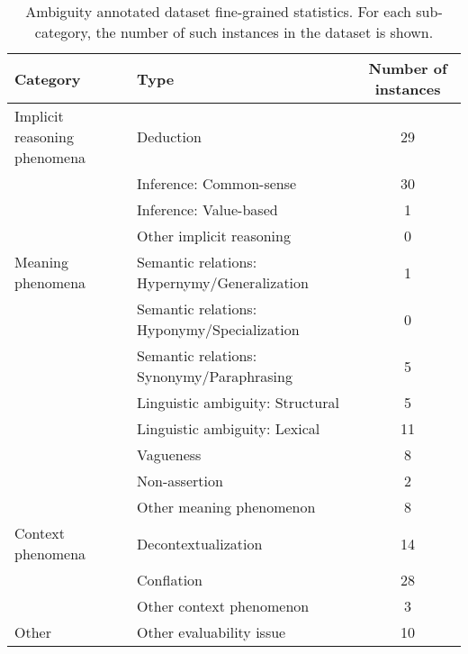 \begin{table*}
\small
\centering
\begin{tabular}{@{}l|l|c@{}}
\toprule
\textbf{Category}& \textbf{Type} & \textbf{Number of instances} \\ 
\midrule
Implicit reasoning phenomena & Deduction &  29                                           \\
\cmidrule{2-3}
& Inference: Common-sense  &     30        \\
                             \cmidrule{2-3}
                             & Inference:  Value-based& 1\\
                             \cmidrule{2-3}
                             & Other implicit reasoning& 0\\
\midrule
Meaning phenomena            &Semantic relations:  Hypernymy/Generalization                                & 1\\
\cmidrule{2-3}
&Semantic relations: Hyponymy/Specialization& 0                                               \\
                             \cmidrule{2-3}
                             &Semantic relations: Synonymy/Paraphrasing                                   & 5    \\
                             \cmidrule{2-3}
                             &Linguistic ambiguity: Structural                                              &   5 \\
                             \cmidrule{2-3}
                             &Linguistic ambiguity: Lexical                                                 &   11                                    \\
                             \cmidrule{2-3}
                             & Vagueness&  8\\
\cmidrule{2-3}
                             & Non-assertion                                & 2\\
                             \cmidrule{2-3}
                             & Other meaning phenomenon                                & 8 \\
\midrule
Context phenomena            & Decontextualization                                     &       14              \\
\cmidrule{2-3}
                             & Conflation                                              &  28 \\
                             \cmidrule{2-3}
                             & Other context phenomenon                                & 3
\\
\midrule
                       Other &  Other evaluability issue    & 10
\\ \bottomrule
\end{tabular}
\caption{Ambiguity annotated dataset fine-grained statistics. For each sub-category, the number of such instances in the dataset is shown.}
\label{tab:ambiguity_stats_fine}
\end{table*}